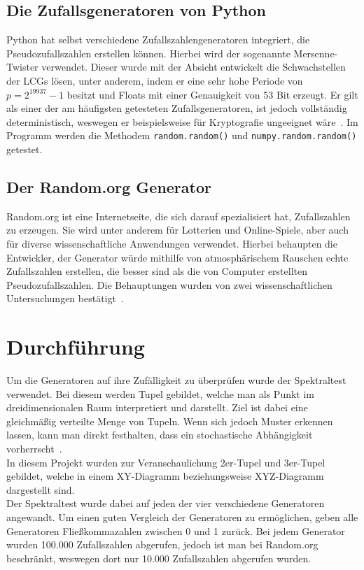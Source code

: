 \documentclass[12pt]{article}
\begin{document}
    \subsection{Die Zufallsgeneratoren von Python}\label{subsec:die-zufallsgeneratoren-von-python}
    Python hat selbst verschiedene Zufallszahlengeneratoren integriert, die Pseudozufallszahlen erstellen können.
    Hierbei wird der sogenannte Mersenne-Twister verwendet.
    Dieser wurde mit der Absicht entwickelt die Schwachstellen der LCGs lösen, unter anderem,
    indem er eine sehr hohe Periode von $p=2^{19937}-1$ besitzt und Floats mit einer Genauigkeit von 53 Bit erzeugt.
    Er gilt als einer der am häufigsten getesteten Zufallsgeneratoren, ist jedoch vollständig deterministisch,
    weswegen er beispielsweise für Kryptografie ungeeignet wäre~\cite{python-random,mersenne-twister}.
    Im Programm werden die Methodem \texttt{random.random()} und \texttt{numpy.random.random()} getestet.

    \vfill

    \subsection{Der Random.org Generator}\label{subsec:der-random.org-generator}
    Random.org ist eine Internetseite, die sich darauf spezialisiert hat, Zufallszahlen zu erzeugen.
    Sie wird unter anderem für Lotterien und Online-Spiele, aber auch für diverse wissenschaftliche
    Anwendungen verwendet.
    Hierbei behaupten die Entwickler, der Generator würde mithilfe von atmosphärischem Rauschen echte Zufallszahlen erstellen,
    die besser sind als die von Computer erstellten Pseudozufallszahlen.
    Die Behauptungen wurden von zwei wissenschaftlichen Untersuchungen bestätigt~\cite{random-org}.

    \vfill

    \section{Durchführung}\label{sec:Durchfuehrung}
    Um die Generatoren auf ihre Zufälligkeit zu überprüfen wurde der Spektraltest verwendet.
    Bei diesem werden Tupel gebildet, welche man als Punkt im dreidimensionalen Raum interpretiert und darstellt.
    Ziel ist dabei eine gleichmäßig verteilte Menge von Tupeln.
    Wenn sich jedoch Muster erkennen lassen, kann man direkt festhalten, dass ein stochastische Abhängigkeit vorherrscht~\cite{spektraltest}.
    \\
    In diesem Projekt wurden zur Veranschaulichung 2er-Tupel und 3er-Tupel gebildet,
    welche in einem XY-Diagramm beziehungsweise XYZ-Diagramm dargestellt sind.
    \\
    Der Spektraltest wurde dabei auf jeden der vier verschiedene Generatoren angewandt.
    Um einen guten Vergleich der Generatoren zu ermöglichen, geben alle Generatoren Fließkommazahlen zwischen 0 und 1 zurück.
    Bei jedem Generator wurden 100.000 Zufallszahlen abgerufen, jedoch ist man bei Random.org beschränkt,
    weswegen dort nur 10.000 Zufallszahlen abgerufen wurden.
\end{document}
